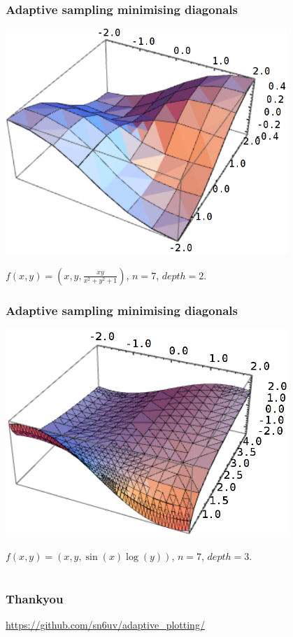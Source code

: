 \documentclass{beamer}
\begin{document}
\begin{frame}
\frametitle{Adaptive sampling minimising diagonals}
\begin{center}
\includegraphics[width=0.8\textwidth]{3Dadaptive.png}
\end{center}
$f(x,y) = \left(x,y, \frac{x y}{x^2 + y^2 + 1}\right)$, $n = 7$, $depth=2$.
\end{frame}

\begin{frame}
\frametitle{Adaptive sampling minimising diagonals}
\begin{center}
\includegraphics[width=0.8\textwidth]{3Dpretty.png}
\end{center}
$f(x,y) = \left(x,y, \sin(x) \log(y)\right)$, $n = 7$, $depth=3$.
\end{frame}

\section*{}
\begin{frame}
\frametitle{Thankyou}
\url{https://github.com/sn6uv/adaptive_plotting/}

\end{frame}
\end{document}
